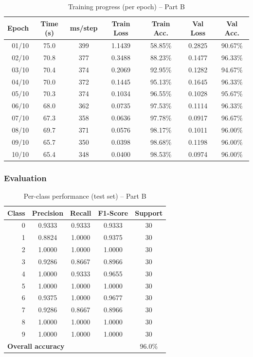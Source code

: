 \begin{table}[H]
\centering
\caption{Training progress (per epoch) -- Part B}
\label{tab:p3b_epochs}
\begin{tabular}{rcccccc}
\toprule
Epoch & Time (s) & ms/step & Train Loss & Train Acc. & Val Loss & Val Acc. \\
\midrule
01/10 & 75.0 & 399 & 1.1439 & 58.85\% & 0.2825 & 90.67\% \\
02/10 & 70.8 & 377 & 0.3488 & 88.23\% & 0.1477 & 96.33\% \\
03/10 & 70.4 & 374 & 0.2069 & 92.95\% & 0.1282 & 94.67\% \\
04/10 & 70.0 & 372 & 0.1445 & 95.13\% & 0.1645 & 96.33\% \\
05/10 & 70.3 & 374 & 0.1034 & 96.55\% & 0.1028 & 95.67\% \\
06/10 & 68.0 & 362 & 0.0735 & 97.53\% & 0.1114 & 96.33\% \\
07/10 & 67.3 & 358 & 0.0636 & 97.78\% & 0.0917 & 96.67\% \\
08/10 & 69.7 & 371 & 0.0576 & 98.17\% & 0.1011 & 96.00\% \\
09/10 & 65.7 & 350 & 0.0398 & 98.68\% & 0.1198 & 96.00\% \\
10/10 & 65.4 & 348 & 0.0400 & 98.53\% & 0.0974 & 96.00\% \\
\bottomrule
\end{tabular}
\end{table}

\subsubsection*{Evaluation}
\begin{table}[H]
\centering
\caption{Per-class performance (test set) -- Part B}
\label{tab:p3b_perclass}
\begin{tabular}{rcccc}
\toprule
Class & Precision & Recall & F1-Score & Support \\
\midrule
0 & 0.9333 & 0.9333 & 0.9333 & 30 \\
1 & 0.8824 & 1.0000 & 0.9375 & 30 \\
2 & 1.0000 & 1.0000 & 1.0000 & 30 \\
3 & 0.9286 & 0.8667 & 0.8966 & 30 \\
4 & 1.0000 & 0.9333 & 0.9655 & 30 \\
5 & 1.0000 & 1.0000 & 1.0000 & 30 \\
6 & 0.9375 & 1.0000 & 0.9677 & 30 \\
7 & 0.9286 & 0.8667 & 0.8966 & 30 \\
8 & 1.0000 & 1.0000 & 1.0000 & 30 \\
9 & 1.0000 & 1.0000 & 1.0000 & 30 \\
\midrule
\multicolumn{4}{l}{\textbf{Overall accuracy}} & 96.0\% \\
\bottomrule
\end{tabular}
\end{table}

